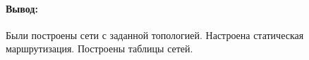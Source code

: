 \paragraph{Вывод:}
Были построены сети с заданной топологией.
Настроена статическая маршрутизация.
Построены таблицы сетей.